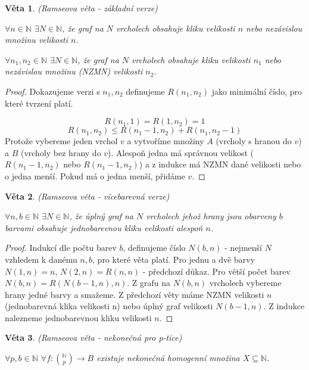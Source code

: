 \documentclass[a4paper,10pt,titlepage]{article} \usepackage[utf8]{inputenc}
\newtheorem{theorem}{Věta}
\begin{document}
\begin{theorem}
(Ramseova věta - základní verze)

$\forall n \in \mathbb{N}$ $\exists N \in \mathbb{N}$, že graf na $N$ vrcholech obsahuje kliku velikosti $n$ nebo
nezávislou množinu velikosti $n$.

$\forall n_1, n_2 \in \mathbb{N}$ $\exists N \in \mathbb{N}$, že graf na $N$ vrcholech obsahuje kliku velikosti $n_1$ nebo
nezávislou množinu (NZMN) velikosti $n_2$.
\end{theorem}

\begin{proof}
Dokazujeme verzi s $n_1,n_2$ definujeme $R(n_1,n_2)$ jako minimální číslo, pro které tvrzení platí.

\[
	R(n_1,1) = R(1,n_2) = 1
\]
\[
	R(n_1,n_2) \leq R(n_1-1,n_2) + R(n_1,n_2-1)
\]
Protože vybereme jeden vrchol $v$ a vytvoříme množiny $A$ (vrcholy s hranou do $v$) a $B$ (vrcholy bez hrany do $v$).
Alespoň jedna má správnou velikost ($R(n_1-1,n_2)$ nebo $R(n_1-1,n_2)$) a z indukce má NZMN dané velikosti nebo o jedna menší.
Pokud má o jedna menší, přidáme $v$.
\end{proof}

\begin{theorem}
(Ramseova věta - vícebarevná verze)

$\forall n,b \in \mathbb{N}$ $\exists N \in \mathbb{N}$, že úplný graf na $N$ vrcholech jehož hrany jsou obarveny $b$ barvami
obsahuje jednobarevnou kliku velikosti alespoň $n$.
\end{theorem}

\begin{proof}
Indukcí dle počtu barev $b$, definujeme číslo $N(b,n)$ - nejmenší $N$ vzhledem k danému $n,b$, pro které věta platí.
Pro jednu a dvě barvy $N(1,n)=n$, $N(2,n)=R(n,n)$ - předchozí důkaz.
Pro větší počet barev $N(b,n) = R(N(b-1,n),n)$.
Z grafu na $N(b,n)$ vrcholech vybereme hrany jedné barvy a smažeme.
Z předchozí věty máme NZMN velikosti $n$ (jednobarevná klika velikosti n) nebo úplný graf velikosti $N(b-1,n)$.
Z indukce nalezneme jednobarevnou kliku velikosti $n$.
\end{proof}

\begin{theorem}
(Ramseova věta - nekonečná pro p-tice)

$\forall p,b \in \mathbb{N}$ $\forall f:\binom{\mathbb N}{p} \rightarrow B$ existuje nekonečná homogenní množina $X \subseteq \mathbb{N}$.
\end{theorem}
\end{document}
